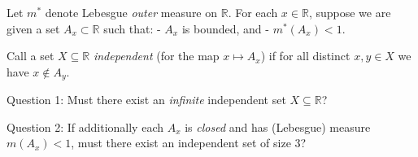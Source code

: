 Let $m^*$ denote Lebesgue \emph{outer} measure on $\mathbb R$.
For each $x\in\mathbb R$, suppose we are given a set $A_x\subset\mathbb R$ such that:
- $A_x$ is bounded, and
- $m^*(A_x)<1$.

Call a set $X\subseteq\mathbb R$ \emph{independent} (for the map $x\mapsto A_x$) if for all distinct $x,y\in X$ we have $x\notin A_y$.

Question 1: Must there exist an \emph{infinite} independent set $X\subseteq\mathbb R$?

Question 2: If additionally each $A_x$ is \emph{closed} and has (Lebesgue) measure $m(A_x)<1$, must there exist an independent set of size $3$?
